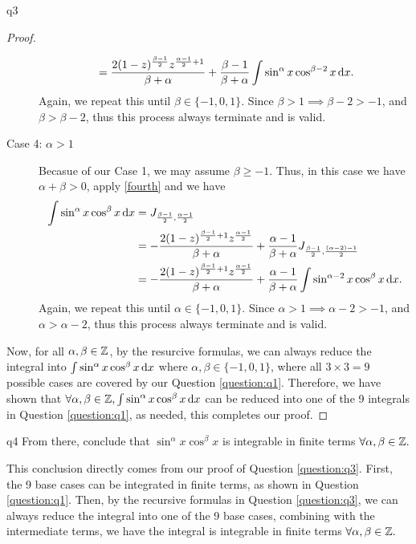 \documentclass[reqno]{alittlebear}
\begin{document}
\begin{exercise}{}{}
\begin{question}{}{q3}
\begin{proof}
\begin{description}
\begin{align*}
                    &=\frac{2(1-z)^{\frac{\beta-1}{2}}z^{\frac{\alpha-1}{2}+1}}{\beta+\alpha}+\frac{\beta-1}{\beta+\alpha}\int\sin^\alpha x\cos^{\beta-2} x\mathop{}\!\mathrm{d} x.\\
                \end{align*}
                Again, we repeat this until $\beta\in\{-1,0,1\}$. Since $\beta>1\implies\beta-2>-1$, and $\beta>\beta-2$, thus this process always terminate and is valid.
                \item[Case 4: $\alpha>1$] Becasue of our Case 1, we may assume $\beta\geq-1$. Thus, in this case we have $\alpha+\beta>0$, apply \eqref{fourth} and we have \begin{align*}
                    \int\sin^\alpha x\cos^\beta x\mathop{}\!\mathrm{d} x &= J_{\frac{\beta-1}{2},\frac{\alpha-1}{2}}\\
                    &=-\frac{2(1-z)^{\frac{\beta-1}{2}+1}z^{\frac{\alpha-1}{2}}}{\beta+\alpha}+\frac{\alpha-1}{\beta+\alpha}J_{\frac{\beta-1}{2},\frac{(\alpha-2)-1}{2}}\\
                    &=-\frac{2(1-z)^{\frac{\beta-1}{2}+1}z^{\frac{\alpha-1}{2}}}{\beta+\alpha}+\frac{\alpha-1}{\beta+\alpha}\int\sin^{\alpha-2} x\cos^{\beta} x\mathop{}\!\mathrm{d} x.\\
                \end{align*}
                Again, we repeat this until $\alpha\in\{-1,0,1\}$. Since $\alpha>1\implies\alpha-2>-1$, and $\alpha>\alpha-2$, thus this process always terminate and is valid.
            \end{description}

            Now, for all $\alpha,\beta\in\mathbb{Z}$, by the resurcive formulas, we can always reduce the integral into $\int \sin^\alpha x\cos^\beta x\mathop{}\!\mathrm{d} x$ where $\alpha,\beta\in\{-1,0,1\}$, where all $3\times3=9$ possible cases are covered by our Question \ref{question:q1}. Therefore, we have shown that $\forall\alpha,\beta\in\mathbb{Z}, \int \sin^\alpha x\cos^\beta x\mathop{}\!\mathrm{d} x$ can be reduced into one of the 9 integrals in Question \ref{question:q1}, as needed, this completes our proof.

        \end{proof}
    \end{question}
    \begin{question}{}{q4}
        From there, conclude that $\sin^\alpha x\cos ^\beta x$ is integrable in finite terms $\forall \alpha,\beta\in\mathbb{Z}.$
        \qbreak
        \begin{mathnote}
            This conclusion directly comes from our proof of Question \ref{question:q3}. First, the 9 base cases can be integrated in finite terms, as shown in Question \ref{question:q1}. Then, by the recursive formulas in Question \ref{question:q3}, we can always reduce the integral into one of the 9 base cases, combining with the intermediate terms, we have the integral is integrable in finite terms $\forall \alpha,\beta\in\mathbb{Z}.$
            
            \hfill
        \end{mathnote}
    \end{question}
\end{exercise}
\end{document}
